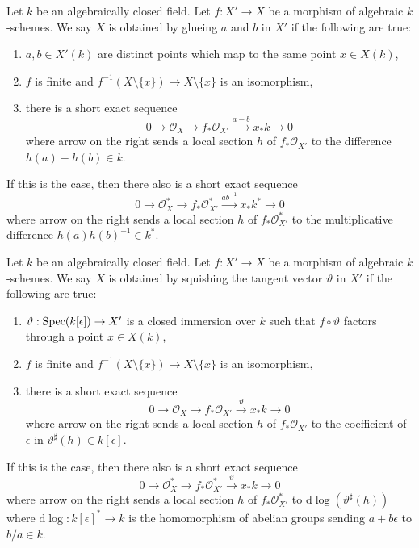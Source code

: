 \begin{example}
\label{example-glue-points}
Let $k$ be an algebraically closed field. Let $f : X' \to X$
be a morphism of algebraic $k$-schemes. We say $X$ is
obtained by glueing $a$ and $b$ in $X'$ if the following are true:
\begin{enumerate}
\item $a, b \in X'(k)$ are distinct points which map to the same
point $x \in X(k)$,
\item $f$ is finite and
$f^{-1}(X \setminus \{x\}) \to X \setminus \{x\}$ is an isomorphism,
\item there is a short exact sequence
$$
0 \to \mathcal{O}_X \to f_*\mathcal{O}_{X'} \xrightarrow{a - b} x_*k \to 0
$$
where arrow on the right sends a local section $h$ of $f_*\mathcal{O}_{X'}$
to the difference $h(a) - h(b) \in k$.
\end{enumerate}
If this is the case, then there also is a short exact sequence
$$
0 \to \mathcal{O}_X^* \to f_*\mathcal{O}_{X'}^*
\xrightarrow{ab^{-1}} x_*k^* \to 0
$$
where arrow on the right sends a local section $h$ of $f_*\mathcal{O}_{X'}^*$
to the multiplicative difference $h(a)h(b)^{-1} \in k^*$.
\end{example}

\begin{example}
\label{example-squish-tangent-vector}
Let $k$ be an algebraically closed field. Let $f : X' \to X$
be a morphism of algebraic $k$-schemes. We say $X$ is
obtained by squishing the tangent vector $\vartheta$ in $X'$
if the following are true:
\begin{enumerate}
\item $\vartheta : \mathop{\mathrm{Spec}}(k[\epsilon]) \to X'$ is a closed immersion
over $k$ such that $f \circ \vartheta$ factors through a point $x \in X(k)$,
\item $f$ is finite and
$f^{-1}(X \setminus \{x\}) \to X \setminus \{x\}$ is an isomorphism,
\item there is a short exact sequence
$$
0 \to \mathcal{O}_X \to f_*\mathcal{O}_{X'} \xrightarrow{\vartheta} x_*k \to 0
$$
where arrow on the right sends a local section $h$ of $f_*\mathcal{O}_{X'}$
to the coefficient of $\epsilon$ in $\vartheta^\sharp(h) \in k[\epsilon]$.
\end{enumerate}
If this is the case, then there also is a short exact sequence
$$
0 \to \mathcal{O}_X^* \to f_*\mathcal{O}_{X'}^*
\xrightarrow{\vartheta} x_*k \to 0
$$
where arrow on the right sends a local section $h$ of $f_*\mathcal{O}_{X'}^*$
to $\text{d}\log(\vartheta^\sharp(h))$ where
$\text{d}\log : k[\epsilon]^* \to k$
is the homomorphism of abelian groups sending $a + b\epsilon$ to $b/a \in k$.
\end{example}

